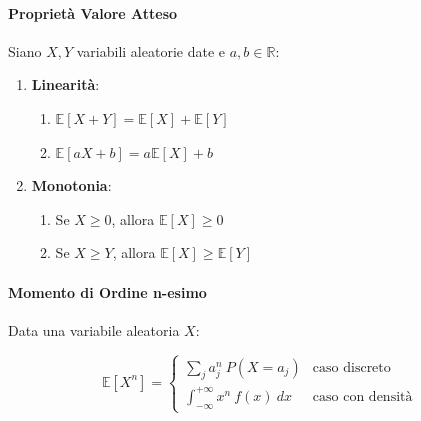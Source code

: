 \documentclass{article}
\begin{document}
\paragraph{Proprietà Valore Atteso} Siano $X,Y$ variabili aleatorie date e $a,b \in \mathbb{R}$:

\begin{enumerate}
    \item \textbf{Linearità}:
    \begin{enumerate}
        \item $\mathbb{E}[X+Y] = \mathbb{E}[X] + \mathbb{E}[Y]$
        \item $\mathbb{E}[aX+b] = a\mathbb{E}[X] + b$
    \end{enumerate}
    \item \textbf{Monotonia}:
    \begin{enumerate}
        \item Se $X \geq 0$, allora $\mathbb{E}[X] \geq 0$
        \item Se $X \geq Y$, allora $\mathbb{E}[X] \geq \mathbb{E}[Y]$
    \end{enumerate}
\end{enumerate}

\paragraph{Momento di Ordine n-esimo} Data una variabile aleatoria $X$:

\[ \mathbb{E}[X^{n}] =  \left\{ \begin{array}{rcl}
        \sum_{j} a^{n}_{j} \: P(X = a_{j}) & \mbox{caso discreto}  \\
        \int_{-\infty}^{+\infty} x^{n}\: f(x) \: dx   & \mbox{caso con densità} 
        \end{array}\right. \]

\newpage
\end{document}
